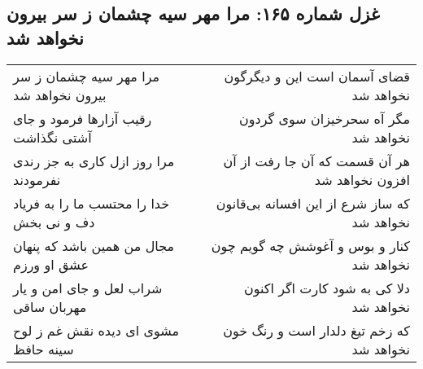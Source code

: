 \begin{center}
\section*{غزل شماره ۱۶۵: مرا مهر سیه چشمان ز سر بیرون نخواهد شد}
\label{sec:sh165}
\begin{longtable}{l p{0.5cm} r}
مرا مهر سیه چشمان ز سر بیرون نخواهد شد
&&
قضای آسمان است این و دیگرگون نخواهد شد
\\
رقیب آزارها فرمود و جای آشتی نگذاشت
&&
مگر آه سحرخیزان سوی گردون نخواهد شد
\\
مرا روز ازل کاری به جز رندی نفرمودند
&&
هر آن قسمت که آن جا رفت از آن افزون نخواهد شد
\\
خدا را محتسب ما را به فریاد دف و نی بخش
&&
که ساز شرع از این افسانه بی‌قانون نخواهد شد
\\
مجال من همین باشد که پنهان عشق او ورزم
&&
کنار و بوس و آغوشش چه گویم چون نخواهد شد
\\
شراب لعل و جای امن و یار مهربان ساقی
&&
دلا کی به شود کارت اگر اکنون نخواهد شد
\\
مشوی ای دیده نقش غم ز لوح سینه حافظ
&&
که زخم تیغ دلدار است و رنگ خون نخواهد شد
\\
\end{longtable}
\end{center}
